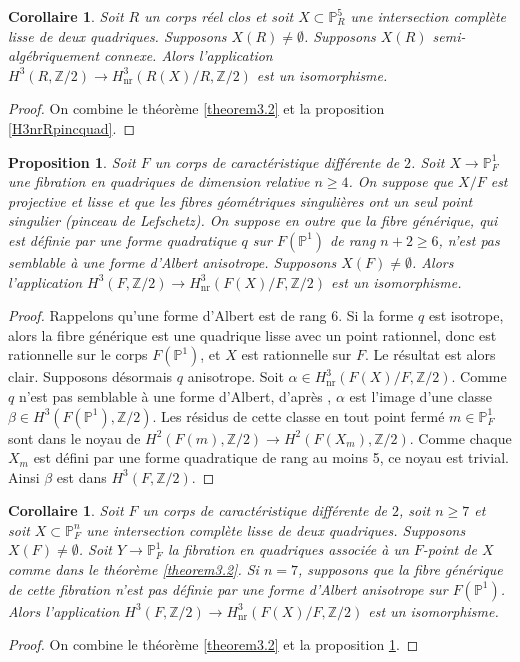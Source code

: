 \documentclass[JEP,XML,SOM,Unicode,francais,published]{cedram}
\newtheorem{prop}[thm]{Proposition}
\newtheorem{cor}[thm]{Corollaire}
\theoremstyle{definition}
\newcommand{\Z}{\mathbb Z}
\renewcommand{\P}{\mathbb P}
\newcommand{\on}[1]{\operatorname{#1}}
\begin{document}
\begin{cor}\label{H3Rnrdeuxquad}
Soit $R$ un corps réel clos et soit $X \subset \P^5_{R}$ une intersection complète lisse de deux quadriques. Supposons $X(R) \neq \emptyset$. Supposons $X(R)$ semi-algébriquement connexe.
Alors l'application $ H^3(R, \Z/2) \to H^3_{\on{nr}}(R(X)/R, \Z/2)$
est un isomorphisme.
\end{cor}

\begin{proof}
On combine le théorème \ref{theorem3.2} et la proposition \ref{H3nrRpincquad}.
\end{proof}

\begin{prop}\label{fibP1Rrelplus4}
Soit $F$ un corps de caractéristique différente de $2$.
Soit $X\to \P^1_{F}$ une fibration en quadriques de dimension relative $n\geq 4$.
On suppose que $X/F$ est projective et lisse
et que les fibres géométriques singulières ont un seul point singulier
(pinceau de Lefschetz).
On suppose en outre que la fibre générique, qui est définie par
une forme quadratique $q$ sur $F(\P^1)$ de rang $n+2\geq 6 $,
n'est pas semblable à une forme d'Albert anisotrope.
Supposons $X(F)\neq \emptyset$.
Alors l'application $H^3(F,\Z/2) \to H^3_{\on{nr}}(F(X)/F, \Z/2)$ est
un isomorphisme.
\end{prop}

\begin{proof}
Rappelons qu'une forme d'Albert est de rang $6$. Si la forme $q$ est isotrope, alors la fibre générique est une quadrique lisse avec un point rationnel, donc est rationnelle sur le corps $F(\P^1)$,
et $X$ est rationnelle sur $F$. Le résultat est alors clair. Supposons désormais $q$ anisotrope.
Soit $\alpha \in H^3_{\on{nr}}(F(X)/F, \Z/2)$. Comme $q$
n'est pas semblable à une forme d'Albert, d'après
\cite[Th.\,5]{kahn1998unramified},
$\alpha$ est l'image d'une classe $\beta \in H^3(F(\P^1),\Z/2)$.
Les résidus de cette classe en tout point fermé $m \in \P^1_F$
sont dans le noyau de $H^2(F(m), \Z/2) \to H^2(F(X_{m}), \Z/2)$.
Comme chaque $X_{m}$ est défini par une forme quadratique de rang au moins 5,
ce noyau est trivial. Ainsi $\beta$ est dans $H^3(F,\Z/2)$.
\end{proof}

\begin{cor}\label{2quadsurFngeq7}
Soit $F$ un corps de caractéristique différente de $2$, soit \hbox{$n\!\geq\! 7$} et soit $X \!\subset\! \P^n_F$ une intersection complète lisse de deux quadriques. Supposons \hbox{$X(F) \!\neq\! \emptyset$}.
Soit $Y \to \P^1_F$ la fibration en quadriques associée à un $F$-point de $X$ comme dans le théorème \ref{theorem3.2}.
Si $n=7$, supposons que la fibre générique de cette fibration n'est pas définie par une forme d'Albert anisotrope sur $F(\P^1)$. Alors l'application $H^3(F,\Z/2) \to H^3_{\on{nr}}(F(X)/F, \Z/2)$ est un isomorphisme.
\end{cor}
\begin{proof}
On combine le théorème \ref{theorem3.2} et la proposition \ref{fibP1Rrelplus4}.
\end{proof}
\end{document}
